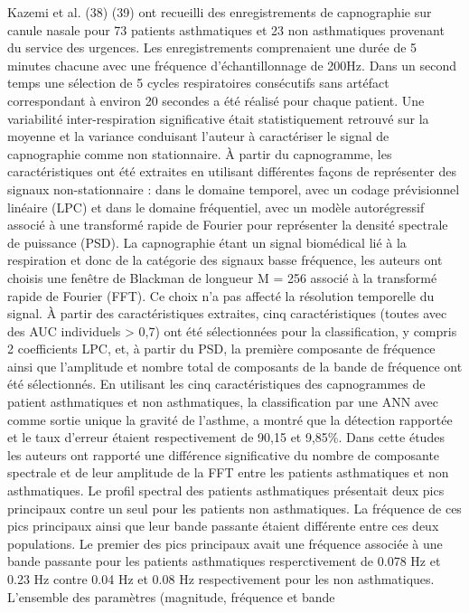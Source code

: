 \documentclass[12pt,]{article}
\begin{document}
Kazemi et al. (38) (39) ont recueilli des enregistrements de
capnographie sur canule nasale pour 73 patients asthmatiques et 23 non
asthmatiques provenant du service des urgences. Les enregistrements
comprenaient une durée de 5 minutes chacune avec une fréquence
d'échantillonnage de 200Hz. Dans un second temps une sélection de 5
cycles respiratoires consécutifs sans artéfact correspondant à environ
20 secondes a été réalisé pour chaque patient. Une variabilité
inter-respiration significative était statistiquement retrouvé sur la
moyenne et la variance conduisant l'auteur à caractériser le signal de
capnographie comme non stationnaire. À partir du capnogramme, les
caractéristiques ont été extraites en utilisant différentes façons de
représenter des signaux non-stationnaire : dans le domaine temporel,
avec un codage prévisionnel linéaire (LPC) et dans le domaine
fréquentiel, avec un modèle autorégressif associé à une transformé
rapide de Fourier pour représenter la densité spectrale de puissance
(PSD). La capnographie étant un signal biomédical lié à la respiration
et donc de la catégorie des signaux basse fréquence, les auteurs ont
choisis une fenêtre de Blackman de longueur M = 256 associé à la
transformé rapide de Fourier (FFT). Ce choix n'a pas affecté la
résolution temporelle du signal. À partir des caractéristiques
extraites, cinq caractéristiques (toutes avec des AUC individuels
\textgreater{} 0,7) ont été sélectionnées pour la classification, y
compris 2 coefficients LPC, et, à partir du PSD, la première composante
de fréquence ainsi que l'amplitude et nombre total de composants de la
bande de fréquence ont été sélectionnés. En utilisant les cinq
caractéristiques des capnogrammes de patient asthmatiques et non
asthmatiques, la classification par une ANN avec comme sortie unique la
gravité de l'asthme, a montré que la détection rapportée et le taux
d'erreur étaient respectivement de 90,15 et 9,85\%. Dans cette études
les auteurs ont rapporté une différence significative du nombre de
composante spectrale et de leur amplitude de la FFT entre les patients
asthmatiques et non asthmatiques. Le profil spectral des patients
asthmatiques présentait deux pics principaux contre un seul pour les
patients non asthmatiques. La fréquence de ces pics principaux ainsi que
leur bande passante étaient différente entre ces deux populations. Le
premier des pics principaux avait une fréquence associée à une bande
passante pour les patients asthmatiques resperctivement de 0.078 Hz et
0.23 Hz contre 0.04 Hz et 0.08 Hz respectivement pour les non
asthmatiques. L'ensemble des paramètres (magnitude, fréquence et bande
\end{document}
